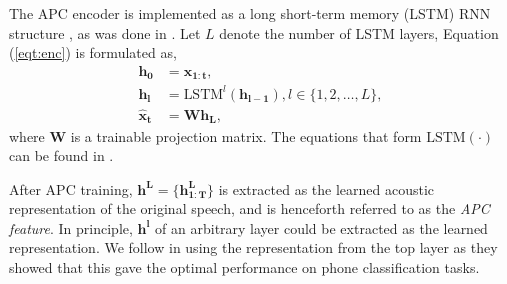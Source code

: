 \documentclass[transmag]{IEEEtran}
\begin{document}
The APC encoder is implemented as a long short-term memory (LSTM) RNN structure \cite{sak2014long}, as was done in \cite{Chung2019}. 
Let $L$ denote the number of LSTM layers,  Equation (\ref{eqt:enc}) is formulated as,
\begin{align}
    \bm{h_0} &= \bm{x_{1:t}},    \\
    \bm{h_l} &= \textrm{LSTM}^l (\bm{h_{l-1}}), l\in \{1,2,\ldots, L\}, \\
    \bm{\hat{x}_t} &= \bm{W} \bm{h_L},
\end{align}
where $\bm{W}$ is a trainable projection matrix. The equations that form  $\textrm{LSTM} (\cdot)$ can be found in \cite{sak2014long}. 



After APC training, $\bm{h^{L}} = \{\bm{h^{L}_{1:T}}\}$ is extracted as the learned acoustic representation of the original speech, and is henceforth referred to as the \textit{APC feature}. In principle, $\bm{h^l}$ of an arbitrary layer could be extracted as the learned representation. We follow \cite{Chung2019} in using the representation from the top layer as they showed that this gave the optimal performance on phone classification tasks.
\end{document}
